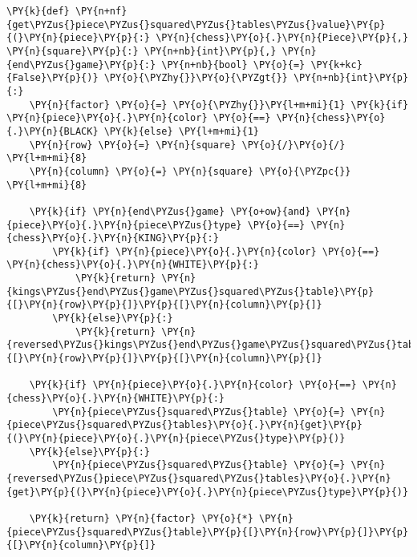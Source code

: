     \begin{tcolorbox}[fontupper=\linespread{.66}\selectfont, breakable, size=fbox, boxrule=1pt, pad at break*=1mm,colback=cellbackground, colframe=cellborder]
\begin{Verbatim}[commandchars=\\\{\}]
\PY{k}{def} \PY{n+nf}{get\PYZus{}piece\PYZus{}squared\PYZus{}tables\PYZus{}value}\PY{p}{(}\PY{n}{piece}\PY{p}{:} \PY{n}{chess}\PY{o}{.}\PY{n}{Piece}\PY{p}{,} \PY{n}{square}\PY{p}{:} \PY{n+nb}{int}\PY{p}{,} \PY{n}{end\PYZus{}game}\PY{p}{:} \PY{n+nb}{bool} \PY{o}{=} \PY{k+kc}{False}\PY{p}{)} \PY{o}{\PYZhy{}}\PY{o}{\PYZgt{}} \PY{n+nb}{int}\PY{p}{:}
    \PY{n}{factor} \PY{o}{=} \PY{o}{\PYZhy{}}\PY{l+m+mi}{1} \PY{k}{if} \PY{n}{piece}\PY{o}{.}\PY{n}{color} \PY{o}{==} \PY{n}{chess}\PY{o}{.}\PY{n}{BLACK} \PY{k}{else} \PY{l+m+mi}{1}
    \PY{n}{row} \PY{o}{=} \PY{n}{square} \PY{o}{/}\PY{o}{/} \PY{l+m+mi}{8}
    \PY{n}{column} \PY{o}{=} \PY{n}{square} \PY{o}{\PYZpc{}} \PY{l+m+mi}{8}
    
    \PY{k}{if} \PY{n}{end\PYZus{}game} \PY{o+ow}{and} \PY{n}{piece}\PY{o}{.}\PY{n}{piece\PYZus{}type} \PY{o}{==} \PY{n}{chess}\PY{o}{.}\PY{n}{KING}\PY{p}{:}
        \PY{k}{if} \PY{n}{piece}\PY{o}{.}\PY{n}{color} \PY{o}{==} \PY{n}{chess}\PY{o}{.}\PY{n}{WHITE}\PY{p}{:}
            \PY{k}{return} \PY{n}{kings\PYZus{}end\PYZus{}game\PYZus{}squared\PYZus{}table}\PY{p}{[}\PY{n}{row}\PY{p}{]}\PY{p}{[}\PY{n}{column}\PY{p}{]}
        \PY{k}{else}\PY{p}{:}
            \PY{k}{return} \PY{n}{reversed\PYZus{}kings\PYZus{}end\PYZus{}game\PYZus{}squared\PYZus{}table}\PY{p}{[}\PY{n}{row}\PY{p}{]}\PY{p}{[}\PY{n}{column}\PY{p}{]}
    
    \PY{k}{if} \PY{n}{piece}\PY{o}{.}\PY{n}{color} \PY{o}{==} \PY{n}{chess}\PY{o}{.}\PY{n}{WHITE}\PY{p}{:}
        \PY{n}{piece\PYZus{}squared\PYZus{}table} \PY{o}{=} \PY{n}{piece\PYZus{}squared\PYZus{}tables}\PY{o}{.}\PY{n}{get}\PY{p}{(}\PY{n}{piece}\PY{o}{.}\PY{n}{piece\PYZus{}type}\PY{p}{)}
    \PY{k}{else}\PY{p}{:}
        \PY{n}{piece\PYZus{}squared\PYZus{}table} \PY{o}{=} \PY{n}{reversed\PYZus{}piece\PYZus{}squared\PYZus{}tables}\PY{o}{.}\PY{n}{get}\PY{p}{(}\PY{n}{piece}\PY{o}{.}\PY{n}{piece\PYZus{}type}\PY{p}{)}
        
    \PY{k}{return} \PY{n}{factor} \PY{o}{*} \PY{n}{piece\PYZus{}squared\PYZus{}table}\PY{p}{[}\PY{n}{row}\PY{p}{]}\PY{p}{[}\PY{n}{column}\PY{p}{]}
\end{Verbatim}
\end{tcolorbox}

